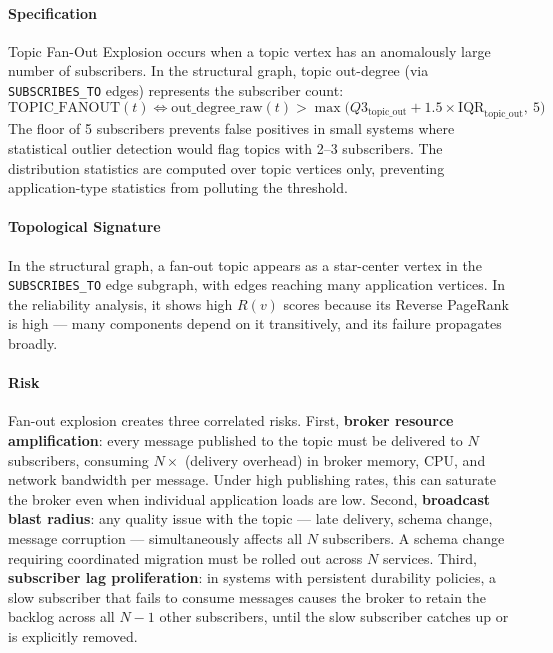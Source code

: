 \documentclass[11pt]{article}
\begin{document}
\paragraph{Specification}
Topic Fan-Out Explosion occurs when a topic vertex has an anomalously large number of subscribers. In the structural graph, topic out-degree (via \texttt{SUBSCRIBES\_TO} edges) represents the subscriber count:
\[
\mathrm{TOPIC\_FANOUT}(t) \Leftrightarrow \mathrm{out\_degree\_raw}(t) > \max\big(Q3_{\text{topic\_out}} + 1.5 \times \mathrm{IQR}_{\text{topic\_out}},\ 5\big)
\]
The floor of 5 subscribers prevents false positives in small systems where statistical outlier detection would flag topics with 2--3 subscribers. The distribution statistics are computed over topic vertices only, preventing application-type statistics from polluting the threshold.

\paragraph{Topological Signature}
In the structural graph, a fan-out topic appears as a star-center vertex in the \texttt{SUBSCRIBES\_TO} edge subgraph, with edges reaching many application vertices. In the reliability analysis, it shows high $R(v)$ scores because its Reverse PageRank is high --- many components depend on it transitively, and its failure propagates broadly.

\paragraph{Risk}
Fan-out explosion creates three correlated risks. First, \textbf{broker resource amplification}: every message published to the topic must be delivered to $N$ subscribers, consuming $N \times$ (delivery overhead) in broker memory, CPU, and network bandwidth per message. Under high publishing rates, this can saturate the broker even when individual application loads are low. Second, \textbf{broadcast blast radius}: any quality issue with the topic --- late delivery, schema change, message corruption --- simultaneously affects all $N$ subscribers. A schema change requiring coordinated migration must be rolled out across $N$ services. Third, \textbf{subscriber lag proliferation}: in systems with persistent durability policies, a slow subscriber that fails to consume messages causes the broker to retain the backlog across all $N-1$ other subscribers, until the slow subscriber catches up or is explicitly removed.
\end{document}
